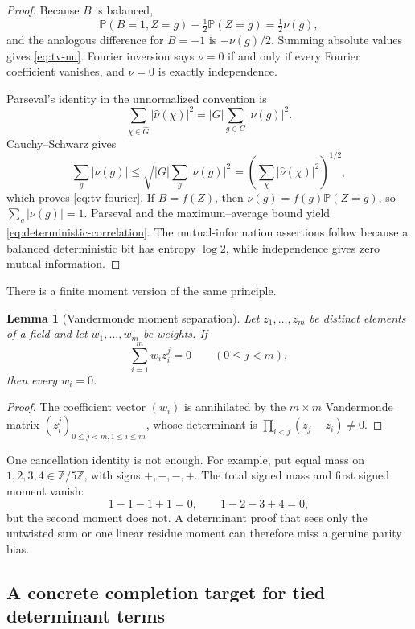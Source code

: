 \documentclass[11pt,oneside]{article}
\newtheorem{lemma}[theorem]{Lemma}
\theoremstyle{definition}
\theoremstyle{remark}
\newcommand{\Z}{\mathbb{Z}}
\newcommand{\Pp}{\mathbb{P}}
\newcommand{\abs}[1]{\left|#1\right|}
\begin{document}
\begin{proof}
Because \(B\) is balanced,
\[
 \Pp(B=1,Z=g)-\tfrac12\Pp(Z=g)=\tfrac12\nu(g),
\]
and the analogous difference for \(B=-1\) is \(-\nu(g)/2\).  Summing absolute values gives \eqref{eq:tv-nu}.  Fourier inversion says \(\nu=0\) if and only if every Fourier coefficient vanishes, and \(\nu=0\) is exactly independence.

Parseval's identity in the unnormalized convention is
\[
 \sum_{\chi\in\widehat G}\abs{\widehat\nu(\chi)}^2
 =\abs G\sum_{g\in G}\abs{\nu(g)}^2.
\]
Cauchy--Schwarz gives
\[
 \sum_g\abs{\nu(g)}
 \leq\sqrt{\abs G\sum_g\abs{\nu(g)}^2}
 =\left(\sum_\chi\abs{\widehat\nu(\chi)}^2\right)^{1/2},
\]
which proves \eqref{eq:tv-fourier}.  If \(B=f(Z)\), then \(\nu(g)=f(g)\Pp(Z=g)\), so \(\sum_g\abs{\nu(g)}=1\).  Parseval and the maximum--average bound yield \eqref{eq:deterministic-correlation}.  The mutual-information assertions follow because a balanced deterministic bit has entropy \(\log2\), while independence gives zero mutual information.
\end{proof}

There is a finite moment version of the same principle.

\begin{lemma}[Vandermonde moment separation]\label{lem:vandermonde-moments}
Let \(z_1,\ldots,z_m\) be distinct elements of a field and let \(w_1,\ldots,w_m\) be weights.  If
\begin{equation}\label{eq:moment-vanish}
 \sum_{i=1}^m w_i z_i^j=0
 \qquad(0\leq j<m),
\end{equation}
then every \(w_i=0\).
\end{lemma}

\begin{proof}
The coefficient vector \((w_i)\) is annihilated by the \(m\times m\) Vandermonde matrix \((z_i^j)_{0\leq j<m,1\leq i\leq m}\), whose determinant is \(\prod_{i<j}(z_j-z_i)\neq0\).
\end{proof}

One cancellation identity is not enough.  For example, put equal mass on \(1,2,3,4\in\Z/5\Z\), with signs \(+,-,-,+\).  The total signed mass and first signed moment vanish:
\[
 1-1-1+1=0,
 \qquad
 1-2-3+4=0,
\]
but the second moment does not.  A determinant proof that sees only the untwisted sum or one linear residue moment can therefore miss a genuine parity bias.

\subsection{A concrete completion target for tied determinant terms}
\end{document}
